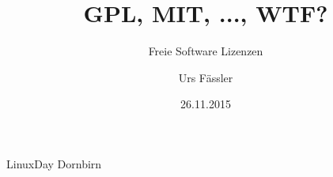 \usepackage[utf8x]{inputenc}
\usepackage{ucs}
\usepackage{amsmath}
\usepackage{amsfonts}
\usepackage{amssymb}
\usepackage{graphicx}
\usepackage{appendixnumberbeamer}
\usepackage{url}
\usepackage{makecell}
\usepackage{tikz}
\usetikzlibrary{arrows, positioning, shapes}
\usetikzlibrary{backgrounds, fit, decorations.pathreplacing, calc}

\title{GPL, MIT, ..., WTF?}
\subtitle{Freie Software Lizenzen}
\author{Urs Fässler}
\date{26.11.2015}
\institute
{
	LinuxDay Dornbirn
}
\subject{CC-BY-SA Urs Fässler}

\newcommand{\todo}[1]{{\color{red}TODO: #1}}

\newcommand{\hnote}[1]{\only<handout>{\footnote{#1}}}
\newcommand{\hcite}[1]{\only<handout>{\cite{#1}}}

\newcommand*\oldmacro{}%
\let\oldmacro\insertshorttitle%
\renewcommand*\insertshorttitle{%
	\oldmacro\hfill%
	\insertframenumber
}

\beamertemplatenavigationsymbolsempty


\newcommand{\subsectionframe}
{
	\begin{frame}[noframenumbering]
		\begin{center}
			\begin{huge}
				\insertsubsection
			\end{huge}
		\end{center}
	\end{frame}
}

\renewcommand\theadalign{cb}
\renewcommand\theadfont{\bfseries}
\renewcommand\theadgape{\Gape[4pt]}
\renewcommand\cellgape{\Gape[4pt]}




\titlepage






{
	\appendix
	
}


